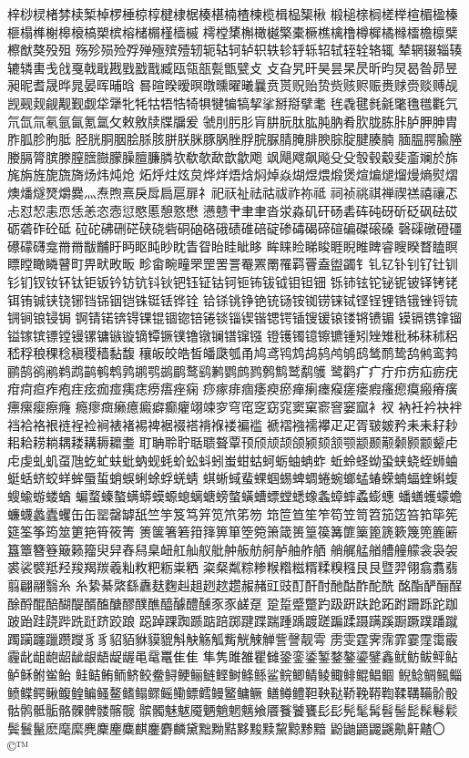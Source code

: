 梓桫棂楮棼椟椠棹椤棰椋椁楗棣椐楱椹楠楂楝榄楫榀榘楸
椴槌榇榈槎榉楦楣楹榛榧榻榫榭槔榱槁槊槟榕槠榍槿樯槭
樗樘橥槲橄樾檠橐橛樵檎橹樽樨橘橼檑檐檩檗檫猷獒殁殂
殇殄殒殓殍殚殛殡殪轫轭轱轲轳轵轶轸轷轹轺轼轾辁辂辄
辇辋辍辎辏辘辚軎戋戗戛戟戢戡戥戤戬臧瓯瓴瓿甏甑甓⽁
攴旮旯旰昊昙杲昃昕昀炅曷昝昴昱昶昵耆晟晔晁晏晖晡晗
晷暄暌暧暝暾曛曜曦曩贲贳贶贻贽赀赅赆赈赉赇赍赕赙觇
觊觋觌觎觏觐觑牮犟牝牦牯牾牿犄犋犍犏犒挈挲掰搿擘耄
毪毳毽毵毹氅氇氆氍氕氘氙氚氡氩氤氪氲攵敕敫牍牒牖爰
虢刖肟肜肓肼朊肽肱肫肭肴肷胧胨胩胪胛胂胄胙胍胗朐胝
胫胱胴胭脍脎胲胼朕脒豚脶脞脬脘脲腈腌腓腴腙腚腱腠腩
腼腽腭腧塍媵膈膂膑滕膣膪臌朦臊膻臁膦欤欷欹歃歆歙飑
飒飓飕飙飚⽎殳彀毂觳斐齑斓於旆旄旃旌旎旒旖炀炜炖炝
炻烀炷炫炱烨烊焐焓焖焯焱煳煜煨煅煲煊煸煺熘熳熵熨熠
燠燔燧燹爝爨灬焘煦熹戾戽扃扈扉礻祀祆祉祛祜祓祚祢祗
祠祯祧祺禅禊禚禧禳忑忐怼恝恚恧恁恙恣悫愆愍慝憩憝懋
懑戆肀⾀聿沓泶淼矶矸砀砉砗砘砑斫砭砜砝砹砺砻砟砼砥
砬砣砩硎硭硖硗砦硐硇硌硪碛碓碚碇碜碡碣碲碹碥磔磙磉
磬磲礅磴礓礤礞礴龛⿋黹黻黼盱眄眍盹眇眈眚眢眙眭眦眵
眸睐睑睇睃睚睨睢睥睿瞍睽瞀瞌瞑瞟瞠瞰瞵瞽町畀畎畋畈
畛畲畹疃罘罡罟詈罨罴罱罹羁罾盍盥蠲钅钆钇钋钊钌钍钏
钐钔钗钕钚钛钜钣钤钫钪钭钬钯钰钲钴钶钷钸钹钺钼钽钿
铄铈铉铊铋铌铍铎铐铑铒铕铖铗铙铘铛铞铟铠铢铤铥铧铨
铪铩铫铮铯铳铴铵铷铹铼铽铿锃锂锆锇锉锊锍锎锏锒锓锔
锕锖锘锛锝锞锟锢锪锫锩锬锱锲锴锶锷锸锼锾锿镂锵镄镅
镆镉镌镎镏镒镓镔镖镗镘镙镛镞镟镝镡镢镤镥镦镧镨镩镪
镫镬镯镱镲镳锺矧矬雉秕秭秣秫稆嵇稃稂稞稔稹稷穑黏馥
穰皈皎皓皙皤瓞瓠甬鸠鸢鸨鸩鸪鸫鸬鸲鸱鸶鸸鸷鸹鸺鸾鹁
鹂鹄鹆鹇鹈鹉鹋鹌鹎鹑鹕鹗鹚鹛鹜鹞鹣鹦鹧鹨鹩鹪鹫鹬鹱
鹭鹳⽧疒疔疖疠疝疬疣疳疴疸痄疱疰痃痂痖痍痣痨痦痤痫
痧瘃痱痼痿瘐瘀瘅瘌瘗瘊瘥瘘瘕瘙瘛瘼瘢瘠癀瘭瘰瘿瘵癃
瘾瘳癍癞癔癜癖癫癯翊竦穸穹窀窆窈窕窦窠窬窨窭窳衤衩
衲衽衿袂袢裆袷袼裉裢裎裣裥裱褚裼裨裾裰褡褙褓褛褊褴
褫褶襁襦襻⽦疋胥皲皴矜⽾耒耔耖耜耠耢耥耦耧耩耨耱耋
耵聃聆聍聒聩聱覃顸颀颃颉颌颍颏颔颚颛颞颟颡颢颥颦⾌
虍虔虬虮虿虺虼虻蚨蚍蚋蚬蚝蚧蚣蚪蚓蚩蚶蛄蚵蛎蚰蚺蚱
蚯蛉蛏蚴蛩蛱蛲蛭蛳蛐蜓蛞蛴蛟蛘蛑蜃蜇蛸蜈蜊蜍蜉蜣蜻
蜞蜥蜮蜚蜾蝈蜴蜱蜩蜷蜿螂蜢蝽蝾蝻蝠蝰蝌蝮螋蝓蝣蝼蝤
蝙蝥螓螯螨蟒蟆螈螅螭螗螃螫蟥螬螵螳蟋蟓螽蟑蟀蟊蟛蟪
蟠蟮蠖蠓蟾蠊蠛蠡蠹蠼⽸缶罂罄罅舐竺竽笈笃笄笕笊笫笏
筇笸笪笙笮笱笠笥笤笳笾笞筘筚筅筵筌筝筠筮筻筢筲筱箐
箦箧箸箬箝箨箅箪箜箢箫箴篑篁篌篝篚篥篦篪簌篾篼簏簖
簋簟簪簦簸籁籀臾舁舂舄臬衄舡舢舣舭舯舨舫舸舻舳舴舾
艄艉艋艏艚艟艨衾袅袈裘裟襞羝羟羧羯羰羲籼敉粑粝粜粞
粢粲粼粽糁糇糌糍糈糅糗糨⾉艮暨羿翎翕翥翡翦翩翮翳⽷
糸絷綦綮繇纛麸麴赳趄趔趑趱赧赭豇豉酊酐酎酏酤酢酡酰
酩酯酽酾酲酴酹醌醅醐醍醑醢醣醪醭醮醯醵醴醺⾗豕鹾趸
跫踅蹙蹩趵趿趼趺跄跖跗跚跞跎跏跛跆跬跷跸跣跹跻跤踉
跽踔踝踟踬踮踣踯踺蹀踹踵踽踱蹉蹁蹂蹑蹒蹊蹰蹶蹼蹯蹴
躅躏躔躐躜躞⾘豸貂貊貅貘貔斛觖觞觚觜觥觫觯訾謦靓雩
雳雯霆霁霈霏霎霪霭霰霾龀龃龅龆龇龈龉龊龌黾鼋鼍⾫隹
隼隽雎雒瞿雠銎銮鋈錾鍪鏊鎏鐾鑫鱿鲂鲅鲆鲇鲈稣鲋鲎鲐
鲑鲒鲔鲕鲚鲛鲞鲟鲠鲡鲢鲣鲥鲦鲧鲨鲩鲫鲭鲮鲰鲱鲲鲳鲴
鲵鲶鲷鲺鲻鲼鲽鳄鳅鳆鳇鳊鳋鳌鳍鳎鳏鳐鳓鳔鳕鳗鳘鳙鳜
鳝鳟鳢靼鞅鞑鞒鞔鞯鞫鞣鞲鞴骱骰骷鹘骶骺骼髁髀髅髂髋
髌髑魅魃魇魉魈魍魑飨餍餮饕饔⾽髟髡髦髯髫髻髭髹鬈鬏
鬓鬟鬣麽麾縻麂麇麈麋麒鏖麝麟黛黜黝黠黟黢黩黧黥黪黯
鼢鼬鼯鼹鼷鼽鼾齄〇©™ 

